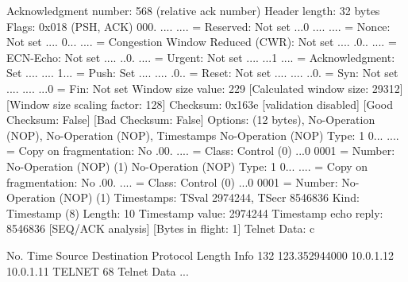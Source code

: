     Acknowledgment number: 568    (relative ack number)
    Header length: 32 bytes
    Flags: 0x018 (PSH, ACK)
        000. .... .... = Reserved: Not set
        ...0 .... .... = Nonce: Not set
        .... 0... .... = Congestion Window Reduced (CWR): Not set
        .... .0.. .... = ECN-Echo: Not set
        .... ..0. .... = Urgent: Not set
        .... ...1 .... = Acknowledgment: Set
        .... .... 1... = Push: Set
        .... .... .0.. = Reset: Not set
        .... .... ..0. = Syn: Not set
        .... .... ...0 = Fin: Not set
    Window size value: 229
    [Calculated window size: 29312]
    [Window size scaling factor: 128]
    Checksum: 0x163e [validation disabled]
        [Good Checksum: False]
        [Bad Checksum: False]
    Options: (12 bytes), No-Operation (NOP), No-Operation (NOP), Timestamps
        No-Operation (NOP)
            Type: 1
                0... .... = Copy on fragmentation: No
                .00. .... = Class: Control (0)
                ...0 0001 = Number: No-Operation (NOP) (1)
        No-Operation (NOP)
            Type: 1
                0... .... = Copy on fragmentation: No
                .00. .... = Class: Control (0)
                ...0 0001 = Number: No-Operation (NOP) (1)
        Timestamps: TSval 2974244, TSecr 8546836
            Kind: Timestamp (8)
            Length: 10
            Timestamp value: 2974244
            Timestamp echo reply: 8546836
    [SEQ/ACK analysis]
        [Bytes in flight: 1]
Telnet
    Data: c

No.     Time           Source                Destination           Protocol Length Info
    132 123.352944000  10.0.1.12             10.0.1.11             TELNET   68     Telnet Data ...

